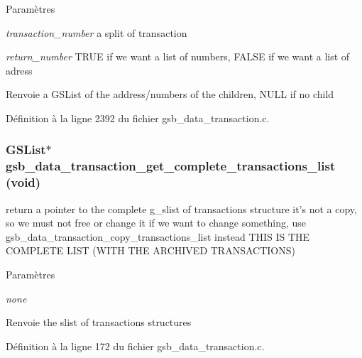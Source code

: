 \begin{DoxyParams}{Paramètres}
\item[{\em transaction\_\-number}]a split of transaction \item[{\em return\_\-number}]TRUE if we want a list of numbers, FALSE if we want a list of adress\end{DoxyParams}
\begin{DoxyReturn}{Renvoie}
a GSList of the address/numbers of the children, NULL if no child 
\end{DoxyReturn}


Définition à la ligne 2392 du fichier gsb\_\-data\_\-transaction.c.

\subsubsection[{gsb\_\-data\_\-transaction\_\-get\_\-complete\_\-transactions\_\-list}]{\setlength{\rightskip}{0pt plus 5cm}GSList$\ast$ gsb\_\-data\_\-transaction\_\-get\_\-complete\_\-transactions\_\-list (void)}\label{gsb__data__transaction_8c_aa54aeb205f29c2272154b2998fea490b}
return a pointer to the complete g\_\-slist of transactions structure it's not a copy, so we must not free or change it if we want to change something, use gsb\_\-data\_\-transaction\_\-copy\_\-transactions\_\-list instead THIS IS THE COMPLETE LIST (WITH THE ARCHIVED TRANSACTIONS)


\begin{DoxyParams}{Paramètres}
\item[{\em none}]\end{DoxyParams}
\begin{DoxyReturn}{Renvoie}
the slist of transactions structures 
\end{DoxyReturn}


Définition à la ligne 172 du fichier gsb\_\-data\_\-transaction.c.

